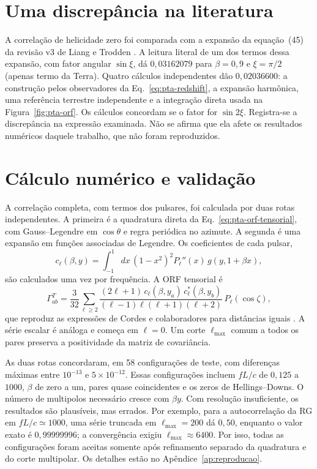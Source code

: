 \section{Uma discrepância na literatura}

A correlação de helicidade zero foi comparada com a expansão da
equação~(45) da revisão v3 de Liang e Trodden \autocite{liang2021}. A
leitura literal de um dos termos dessa expansão, com fator angular
$\sin\xi$, dá $0{,}03162079$ para $\beta=0{,}9$ e $\xi=\pi/2$ (apenas
termo da Terra). Quatro cálculos independentes dão $0{,}02036600$: a
construção pelos observadores da Eq.~\eqref{eq:pta-redshift}, a expansão
harmônica, uma referência terrestre independente e a integração direta
usada na Figura~\ref{fig:pta-orf}. Os cálculos concordam se o fator for
$\sin2\xi$. Registra-se a discrepância na expressão examinada. Não se
afirma que ela afete os resultados numéricos daquele trabalho, que não
foram reproduzidos.

\section{Cálculo numérico e validação}

A correlação completa, com termos dos pulsares, foi calculada por duas
rotas independentes. A primeira é a quadratura direta da
Eq.~\eqref{eq:pta-orf-tensorial}, com Gauss--Legendre em $\cos\theta$ e
regra periódica no azimute. A segunda é uma expansão em funções
associadas de Legendre. Os coeficientes de cada pulsar,
\begin{equation}
 c_\ell(\beta,y)=\int_{-1}^{1}dx\,(1-x^2)^2P_\ell''(x)\,g(y,1+\beta x),
 \label{eq:pta-cl}
\end{equation}
são calculados uma vez por frequência. A ORF tensorial é
\begin{equation}
 \Gamma^T_{ab}=\frac{3}{32}\sum_{\ell\ge2}
 \frac{(2\ell+1)\,c_\ell(\beta,y_a)\,c_\ell^*(\beta,y_b)}
 {(\ell-1)\ell(\ell+1)(\ell+2)}\,P_\ell(\cos\zeta),
 \label{eq:pta-serie}
\end{equation}
que reproduz as expressões de Cordes e colaboradores para distâncias
iguais \autocite{cordes2025}. A série escalar é análoga e começa em
$\ell=0$. Um corte $\ell_{\max}$ comum a todos os pares preserva a
positividade da matriz de covariância.

As duas rotas concordaram, em 58 configurações de teste, com diferenças
máximas entre $10^{-13}$ e $5\times10^{-12}$. Essas configurações
incluem $fL/c$ de $0{,}125$ a $1000$, $\beta$ de zero a um, pares quase
coincidentes e os zeros de Hellings--Downs. O número de multipolos
necessário cresce com $\beta y$. Com resolução insuficiente, os
resultados são plausíveis, mas errados. Por exemplo, para a
autocorrelação da RG em $fL/c\simeq1000$, uma série truncada em
$\ell_{\max}=200$ dá $0{,}50$, enquanto o valor exato é
$0{,}99999996$; a convergência exigiu $\ell_{\max}\approx6400$. Por isso,
todas as configurações foram aceitas somente após refinamento separado
da quadratura e do corte multipolar. Os detalhes estão no
Apêndice~\ref{ap:reproducao}.

